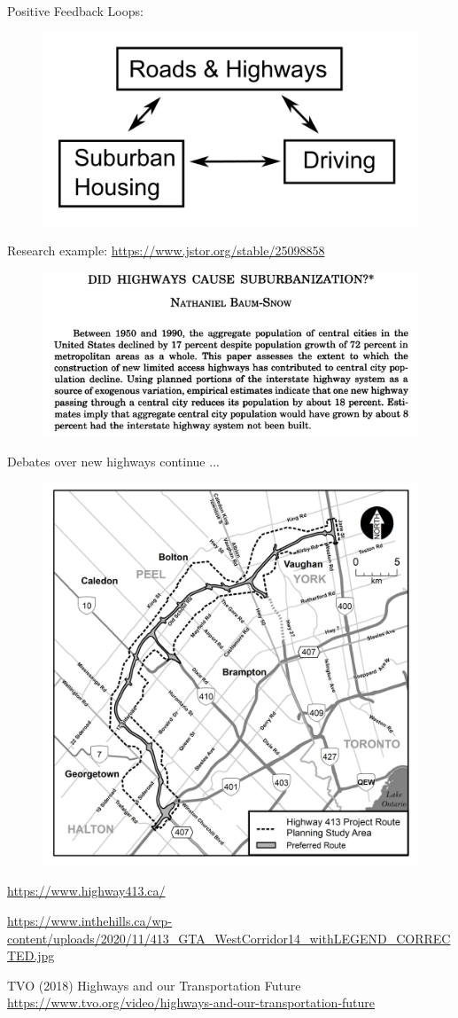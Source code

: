 \documentclass[aspectratio=169]{beamer}
\begin{document}
\begin{frame}
	
	Positive Feedback Loops:
	
	\begin{figure}
		\centering
		\includegraphics[width=0.4\linewidth]{images/feedback_suburb_driving.png}
	\end{figure}

	Research example: \small\url{https://www.jstor.org/stable/25098858}

\begin{figure}
	\centering
	\includegraphics[width=0.7\linewidth]{images/baumsnow_highways.png}
\end{figure}
		
\end{frame}

	



\begin{frame}
	
	Debates over new highways continue ...
	
	\begin{figure}
		\centering
		\includegraphics[width=0.45\linewidth]{images/highway413.jpg}
		
	\end{figure}
	\tiny{\url{https://www.highway413.ca/}}
	
	\vspace{1mm}
	
	 \url{https://www.inthehills.ca/wp-content/uploads/2020/11/413_GTA_WestCorridor14_withLEGEND_CORRECTED.jpg}
	\vspace{1mm}
	
	\tiny{TVO (2018) Highways and our Transportation Future \url{https://www.tvo.org/video/highways-and-our-transportation-future}} 
	
\end{frame}
	
\end{document}
